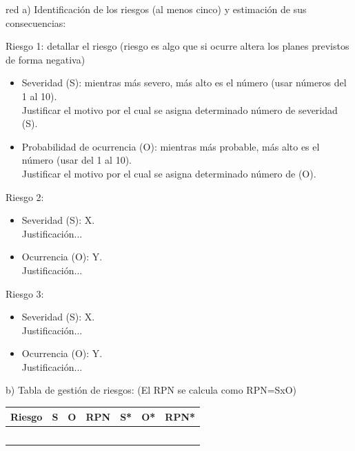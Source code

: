 \documentclass[
11pt, %
codirector, %
]{charter}
\begin{document}
\begin{consigna}{red}
a) Identificación de los riesgos (al menos cinco) y estimación de sus consecuencias:
 
Riesgo 1: detallar el riesgo (riesgo es algo que si ocurre altera los planes previstos de forma negativa)
\begin{itemize}
	\item Severidad (S): mientras más severo, más alto es el número (usar números del 1 al 10).\\
	Justificar el motivo por el cual se asigna determinado número de severidad (S).
	\item Probabilidad de ocurrencia (O): mientras más probable, más alto es el número (usar del 1 al 10).\\
	Justificar el motivo por el cual se asigna determinado número de (O). 
\end{itemize}   

Riesgo 2:
\begin{itemize}
	\item Severidad (S): X.\\
	Justificación...
	\item Ocurrencia (O): Y.\\
	Justificación...
\end{itemize}

Riesgo 3:
\begin{itemize}
	\item Severidad (S):  X.\\
	Justificación...
	\item Ocurrencia (O): Y.\\
	Justificación...
\end{itemize}


b) Tabla de gestión de riesgos:      (El RPN se calcula como RPN=SxO)

\begin{table}[htpb]
\centering
\begin{tabularx}{\linewidth}{@{}|X|c|c|c|c|c|c|@{}}
\hline
\rowcolor[HTML]{C0C0C0} 
Riesgo & S & O & RPN & S* & O* & RPN* \\ \hline
       &   &   &     &    &    &      \\ \hline
       &   &   &     &    &    &      \\ \hline
       &   &   &     &    &    &      \\ \hline
       &   &   &     &    &    &      \\ \hline
       &   &   &     &    &    &      \\ \hline
\end{tabularx}%
\end{table}


\end{consigna}
\end{document}
